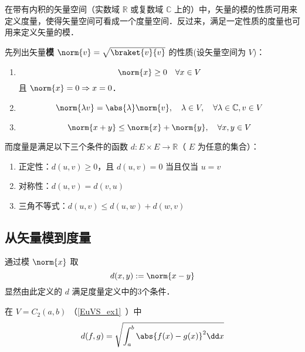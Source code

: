 

在带有内积的矢量空间（实数域 $\mathbb R$ 或复数域 $\mathbb C$ 上的）中，矢量的模的性质可用来定义度量，使得矢量空间可看成一个度量空间．反过来，满足一定性质的度量也可用来定义矢量的模．

先列出矢量\textbf{模} $\norm{v}=\sqrt{\braket{v}{v}}$ 的性质(设矢量空间为 $V$)：
\begin{enumerate}
\item 
\begin{equation}
\norm{x}\geq 0\quad \forall x\in V
\end{equation}
且 $\norm{x}=0\Rightarrow x=0$．
\item \begin{equation}
\norm{\lambda v}=\abs{\lambda}\norm{v},\quad \lambda\in V,\quad\forall\lambda\in\mathbb C,v\in V
\end{equation}
\item 
\begin{equation}
\norm{x+y}\leq\norm{x}+\norm{y},\quad \forall x,y\in V
\end{equation}
\end{enumerate}

而度量是满足以下三个条件的函数 $d:E\times E\rightarrow\mathbb R$（ $E$ 为任意的集合）：
\begin{enumerate}
\item 正定性：$d(u, v) \geq 0$，且 $d(u, v)=0$ 当且仅当 $u=v$
\item 对称性：$d(u, v) = d(v, u)$
\item 三角不等式：$d(u, v) \leqslant d(u, w) + d(w, v)$
\end{enumerate}
\subsection{从矢量模到度量}
通过模 $\norm{x}$ 取
\begin{equation}
d(x,y):=\norm{x-y}
\end{equation}
显然由此定义的 $d$ 满足度量定义中的3个条件．
\begin{example}{}
在 $V=C_2(a,b)$ （\autoref{EuVS_ex1}~）中
\begin{equation}
d(f,g)=\sqrt{\int_a^b\abs{f(x)-g(x)}^2\dd x}
\end{equation}

\end{example}